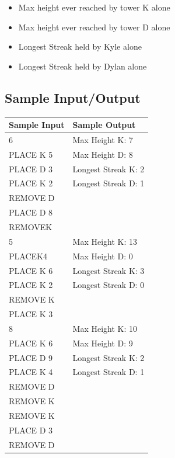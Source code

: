 \documentclass{article}
\begin{document}
\begin{itemize}
    \item Max height ever reached by tower K alone
    \item Max height ever reached by tower D alone
    \item Longest Streak held by Kyle alone
    \item Longest Streak held by Dylan alone
\end{itemize}

\subsection{Sample Input/Output}

\begin{center}
    \begin{tabular}{ |l|l| }
        \hline
        Sample Input & Sample Output \\
        \hline
        6 & Max Height K: 7\\
        PLACE K 5 & Max Height D: 8\\
        PLACE D 3 & Longest Streak K: 2\\
        PLACE K 2 & Longest Streak D: 1\\
        REMOVE D &\\
        PLACE D 8 &\\
        REMOVEK&\\
        \hline
        5 & Max Height K: 13\\
        PLACEK4 & Max Height D: 0\\
        PLACE K 6 & Longest Streak K: 3\\
        PLACE K 2 & Longest Streak D: 0\\
        REMOVE K &\\
        PLACE K 3 &\\
        \hline
        8 & Max Height K: 10\\
        PLACE K 6 & Max Height D: 9\\
        PLACE D 9 & Longest Streak K: 2\\
        PLACE K 4 & Longest Streak D: 1\\
        REMOVE D &\\
        REMOVE K &\\
        REMOVE K &\\
        PLACE D 3 &\\
        REMOVE D &\\
        \hline
    \end{tabular}
\end{center}
\end{document}
